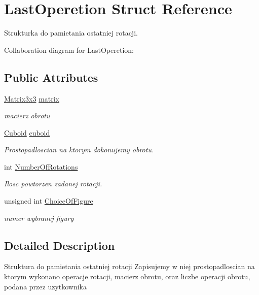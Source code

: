 \hypertarget{struct_last_operetion}{}\section{Last\+Operetion Struct Reference}
\label{struct_last_operetion}


Strukturka do pamietania ostatniej rotacji.  




Collaboration diagram for Last\+Operetion\+:
\subsection*{Public Attributes}
\begin{DoxyCompactItemize}
\item 
\hyperlink{matrix3x3_8hh_ae0d6db325717593a1d1157ecfa156f13}{Matrix3x3} \hyperlink{struct_last_operetion_a9e056b60f7eb77a7e68423b67e150ce4}{matrix}
\begin{DoxyCompactList}\small\item\em macierz obrotu \end{DoxyCompactList}\item 
\hyperlink{class_cuboid}{Cuboid} \hyperlink{struct_last_operetion_a00772e4d91de1dddb951645ad1926cde}{cuboid}
\begin{DoxyCompactList}\small\item\em Prostopadloscian na ktorym dokonujemy obrotu. \end{DoxyCompactList}\item 
int \hyperlink{struct_last_operetion_a9aeead144af43fc85e93e4761c4d4092}{Number\+Of\+Rotations}
\begin{DoxyCompactList}\small\item\em Ilosc powtorzen zadanej rotacji. \end{DoxyCompactList}\item 
unsigned int \hyperlink{struct_last_operetion_abd8b292d5d12fc6876e104a98d427159}{Choice\+Of\+Figure}
\begin{DoxyCompactList}\small\item\em numer wybranej figury \end{DoxyCompactList}\end{DoxyCompactItemize}


\subsection{Detailed Description}
Struktura do pamietania ostatniej rotacji Zapisujemy w niej prostopadloscian na ktorym wykonano operacje rotacji, macierz obrotu, oraz liczbe operacji obrotu, podana przez uzytkownika 

